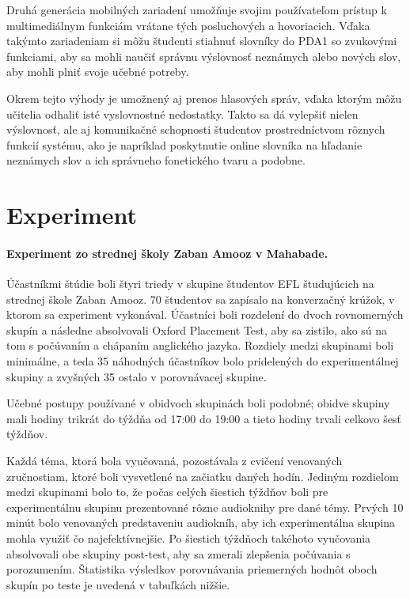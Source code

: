\documentclass[10pt,oneside,slovak,a4paper]{article}
\begin{document}
Druhá generácia mobilných zariadení umožňuje svojim používateľom prístup k multimediálnym funkciám vrátane tých posluchových a hovoriacich\cite{Miangah2012}. Vďaka takýmto zariadeniam si môžu študenti stiahnuť slovníky do PDA1 so zvukovými funkciami, aby sa mohli naučiť správnu výslovnosť neznámych alebo nových slov, aby mohli plniť svoje učebné potreby\cite{Miangah2012}.

Okrem tejto výhody je umožnený aj prenos hlasových správ, vďaka ktorým môžu učitelia odhaliť isté vyslovnostné nedostatky. Takto sa dá vylepšiť nielen výslovnosť, ale aj komunikačné schopnosti študentov prostredníctvom rôznych funkcií systému, ako je napríklad poskytnutie online slovníka na hľadanie neznámych slov a ich správneho fonetického tvaru a podobne\cite{Miangah2012}.



\section{Experiment} \label{experiment}

\paragraph{Experiment zo strednej školy Zaban Amooz v Mahabade\cite{Azar2014}.} Účastníkmi štúdie boli štyri triedy v skupine študentov EFL študujúcich na strednej škole Zaban Amooz. 70 študentov sa zapísalo na konverzačný krúžok, v ktorom sa experiment vykonával. Účastníci boli rozdelení do dvoch rovnomerných skupín a následne absolvovali Oxford Placement Test, aby sa zistilo, ako sú na tom s počúvaním a chápaním anglického jazyka. Rozdiely medzi skupinami boli minimálne, a teda 35 náhodných účastníkov bolo pridelených do experimentálnej skupiny a zvyšných 35 ostalo v porovnávacej skupine.

Učebné postupy používané v obidvoch skupinách boli podobné; obidve skupiny mali hodiny trikrát do týždňa od 17:00 do 19:00 a tieto hodiny trvali celkovo šesť týždňov.

Každá téma, ktorá bola vyučovaná, pozostávala z cvičení venovaných zručnostiam, ktoré boli vysvetlené na začiatku daných hodín. Jediným rozdielom medzi skupinami bolo to, že počas celých šiestich týždňov boli pre experimentálnu skupinu prezentované rôzne audioknihy pre dané témy. Prvých 10 minút bolo venovaných predstaveniu audiokníh, aby ich experimentálna skupina mohla využiť čo najefektívnejšie. Po šiestich týždňoch takéhoto vyučovania absolvovali obe skupiny post-test, aby sa zmerali zlepšenia počúvania s porozumením. Štatistika výsledkov porovnávania priemerných hodnôt oboch skupín po teste je uvedená v tabuľkách nižšie.\\
\end{document}
